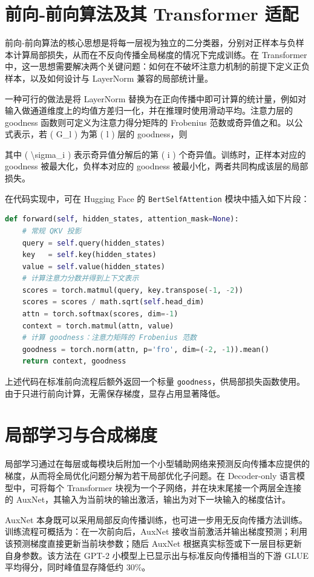 \chapter{前向‐前向算法及其 Transformer 适配}
前向‐前向算法的核心思想是将每一层视为独立的二分类器，分别对正样本与负样本计算局部损失，从而在不反向传播全局梯度的情况下完成训练。在 Transformer 中，这一思想需要解决两个关键问题：如何在不破坏注意力机制的前提下定义正负样本，以及如何设计与 LayerNorm 兼容的局部统计量。\par
一种可行的做法是将 LayerNorm 替换为在正向传播中即可计算的统计量，例如对输入做通道维度上的均值方差归一化，并在推理时使用滑动平均。注意力层的 goodness 函数则可定义为注意力得分矩阵的 Frobenius 范数或奇异值之和。以公式表示，若 ( G\_{}l ) 为第 ( l ) 层的 goodness，则\par
[
G\_{}l = \textbackslash{}sum\_{}\{{}i=1\}{}\^{}\{{}H\}{}\textbackslash{}sigma\_{}i(W\_{}l)
]\par
其中 ( \textbackslash{}sigma\_{}i ) 表示奇异值分解后的第 ( i ) 个奇异值。训练时，正样本对应的 goodness 被最大化，负样本对应的 goodness 被最小化，两者共同构成该层的局部损失。\par
在代码实现中，可在 Hugging Face 的 \texttt{BertSelfAttention} 模块中插入如下片段：\par
\begin{lstlisting}[language=python]
def forward(self, hidden_states, attention_mask=None):
    # 常规 QKV 投影
    query = self.query(hidden_states)
    key   = self.key(hidden_states)
    value = self.value(hidden_states)
    # 计算注意力分数并得到上下文表示
    scores = torch.matmul(query, key.transpose(-1, -2))
    scores = scores / math.sqrt(self.head_dim)
    attn = torch.softmax(scores, dim=-1)
    context = torch.matmul(attn, value)
    # 计算 goodness：注意力矩阵的 Frobenius 范数
    goodness = torch.norm(attn, p='fro', dim=(-2, -1)).mean()
    return context, goodness
\end{lstlisting}
上述代码在标准前向流程后额外返回一个标量 \texttt{goodness}，供局部损失函数使用。由于只进行前向计算，无需保存梯度，显存占用显著降低。\par
\chapter{局部学习与合成梯度}
局部学习通过在每层或每模块后附加一个小型辅助网络来预测反向传播本应提供的梯度，从而将全局优化问题分解为若干局部优化子问题。在 Decoder-only 语言模型中，可将每个 Transformer 块视为一个子网络，并在块末尾接一个两层全连接的 AuxNet，其输入为当前块的输出激活，输出为对下一块输入的梯度估计。\par
AuxNet 本身既可以采用局部反向传播训练，也可进一步用无反向传播方法训练。训练流程可概括为：在一次前向后，AuxNet 接收当前激活并输出梯度预测；利用该预测梯度直接更新当前块参数；随后 AuxNet 根据真实标签或下一层目标更新自身参数。该方法在 GPT-2 小模型上已显示出与标准反向传播相当的下游 GLUE 平均得分，同时峰值显存降低约 30\%{}。\par
